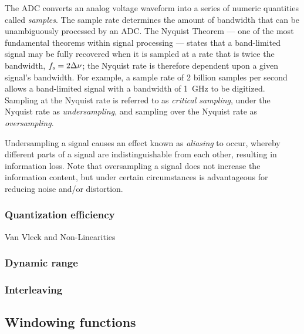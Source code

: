 \documentclass{ws-rv961x669}
\begin{document}
The ADC converts an analog voltage waveform into a series of numeric quantities called \emph{samples}. The sample rate determines the amount of bandwidth that can be unambiguously processed by an ADC. The Nyquist Theorem --- one of the most fundamental theorems within signal processing --- states that a band-limited signal may be fully recovered when it is sampled at a rate that is twice the bandwidth, $f_{\rm{s}} = 2 \Delta\nu$; the Nyquist rate is therefore dependent upon a given signal's bandwidth. For example, a sample rate of 2 billion samples per second allows a band-limited signal with a bandwidth of 1~GHz to be digitized. Sampling at the  Nyquist rate is referred to as \emph{critical sampling}, under the Nyquist rate as \emph{undersampling}, and sampling over the Nyquist rate as \emph{oversampling}.

Undersampling a signal causes an effect known as \emph{aliasing} to occur, whereby different parts of a signal are indistinguishable from each other, resulting in information loss. Note that oversampling a signal does not increase the information content, but under certain circumstances is advantageous for reducing noise and/or distortion.

\subsubsection{Quantization efficiency}

Van Vleck and Non-Linearities

\subsubsection{Dynamic range}

\subsubsection{Interleaving}

\subsection{Windowing functions}
\end{document}
